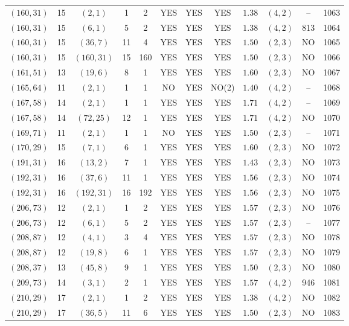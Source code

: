 \begin{longtable}{|c|c|c|c|c|c|c|c|c|c|c|c|}
$(160,31)$ & 15 & $(2,1)$ & 1 & 2 & YES & YES & YES & $1.38$ & $(4,2)$ & -- & 1063\\
$(160,31)$ & 15 & $(6,1)$ & 5 & 2 & YES & YES & YES & $1.38$ & $(4,2)$ & 813 & 1064\\
$(160,31)$ & 15 & $(36,7)$ & 11 & 4 & YES & YES & YES & $1.50$ & $(2,3)$ & NO & 1065\\
$(160,31)$ & 15 & $(160,31)$ & 15 & 160 & YES & YES & YES & $1.50$ & $(2,3)$ & NO & 1066\\
$(161,51)$ & 13 & $(19,6)$ & 8 & 1 & YES & YES & YES & $1.60$ & $(2,3)$ & NO & 1067\\
$(165,64)$ & 11 & $(2,1)$ & 1 & 1 & NO & YES & NO(2) & $1.40$ & $(4,2)$ & -- & 1068\\
$(167,58)$ & 14 & $(2,1)$ & 1 & 1 & YES & YES & YES & $1.71$ & $(4,2)$ & -- & 1069\\
$(167,58)$ & 14 & $(72,25)$ & 12 & 1 & YES & YES & YES & $1.71$ & $(4,2)$ & NO & 1070\\
$(169,71)$ & 11 & $(2,1)$ & 1 & 1 & NO & YES & YES & $1.50$ & $(2,3)$ & -- & 1071\\
$(170,29)$ & 15 & $(7,1)$ & 6 & 1 & YES & YES & YES & $1.60$ & $(2,3)$ & NO & 1072\\
$(191,31)$ & 16 & $(13,2)$ & 7 & 1 & YES & YES & YES & $1.43$ & $(2,3)$ & NO & 1073\\
$(192,31)$ & 16 & $(37,6)$ & 11 & 1 & YES & YES & YES & $1.56$ & $(2,3)$ & NO & 1074\\
$(192,31)$ & 16 & $(192,31)$ & 16 & 192 & YES & YES & YES & $1.56$ & $(2,3)$ & NO & 1075\\
$(206,73)$ & 12 & $(2,1)$ & 1 & 2 & YES & YES & YES & $1.57$ & $(2,3)$ & NO & 1076\\
$(206,73)$ & 12 & $(6,1)$ & 5 & 2 & YES & YES & YES & $1.57$ & $(2,3)$ & -- & 1077\\
$(208,87)$ & 12 & $(4,1)$ & 3 & 4 & YES & YES & YES & $1.57$ & $(2,3)$ & NO & 1078\\
$(208,87)$ & 12 & $(19,8)$ & 6 & 1 & YES & YES & YES & $1.57$ & $(2,3)$ & NO & 1079\\
$(208,37)$ & 13 & $(45,8)$ & 9 & 1 & YES & YES & YES & $1.50$ & $(2,3)$ & NO & 1080\\
$(209,73)$ & 14 & $(3,1)$ & 2 & 1 & YES & YES & YES & $1.57$ & $(4,2)$ & 946 & 1081\\
$(210,29)$ & 17 & $(2,1)$ & 1 & 2 & YES & YES & YES & $1.38$ & $(4,2)$ & NO & 1082\\
$(210,29)$ & 17 & $(36,5)$ & 11 & 6 & YES & YES & YES & $1.50$ & $(2,3)$ & NO & 1083\\

\end{longtable}
